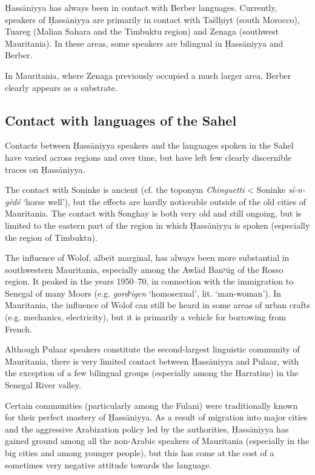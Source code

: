 \documentclass[output=paper]{langsci/langscibook}
\begin{document}
Ḥassāniyya has always been in contact with Berber languages. Currently, speakers of Ḥassāniyya are primarily in contact with Tašlḥiyt (south Morocco), Tuareg (Malian Sahara and the Timbuktu region) and Zenaga (southwest Mauritania). In these areas, some speakers are bilingual in Ḥassāniyya and Berber. 

In Mauritania, where Zenaga previously occupied a much larger area, Berber clearly appears as a substrate.

\subsection{Contact with languages of the Sahel} %

Contacts between Ḥassāniyya speakers and the languages spoken in the Sahel have varied across regions and over time, but have left few clearly discernible traces on Ḥassāniyya.

The contact with Soninke is ancient (cf. the toponym \textit{Chinguetti} < Soninke \textit{sí-n-gèdé} ‘horse well’), but the effects are hardly noticeable outside of the old cities of Mauritania. The contact with Songhay is both very old and still ongoing, but is limited to the eastern part of the region in which Ḥassāniyya is spoken (especially the region of Timbuktu).

The influence of Wolof, albeit marginal, has always been more substantial in southwestern Mauritania, especially among the Awlād Banʸūg of the Rosso region. It peaked in the years 1950–70, in connection with the immigration to Senegal of many Moors (e.g. \textit{gordʸigen} ‘homosexual’, lit. ‘man-woman’). In Mauritania, the influence of Wolof can still be heard in some areas of urban crafts (e.g. mechanics, electricity), but it is primarily a vehicle for borrowing from French.

Although Pulaar speakers constitute the second-largest linguistic community of Mauritania, there is very limited contact between Ḥassāniyya and Pulaar, with the exception of a few bilingual groups (especially among the Harratins) in the Senegal River valley.

Certain communities (particularly among the Fulani) were traditionally known for their perfect mastery of Ḥassāniyya. As a result of migration into major cities and the aggressive Arabization policy led by the authorities, Ḥassāniyya has gained ground among all the non-Arabic speakers of Mauritania (especially in the big cities and among younger people), but this has come at the cost of a sometimes very negative attitude towards the language. 
\end{document}
